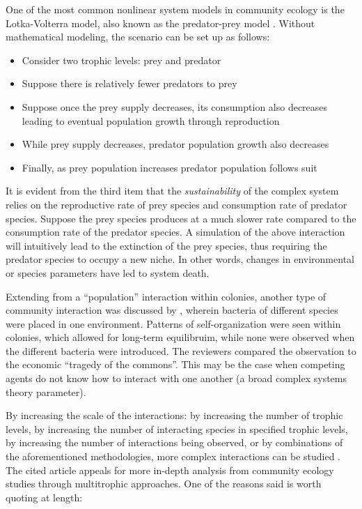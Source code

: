 One of the most common nonlinear system models in community ecology is the Lotka-Volterra model, also known as the predator-prey model \cite{Seibold2018}.
Without mathematical modeling, the scenario can be set up as follows:

\begin{itemize}
    \item Consider two trophic levels: prey and predator
    \item Suppose there is relatively fewer predators to prey
    \item Suppose once the prey supply decreases, its consumption also decreases
    leading to eventual population growth through reproduction
    \item While prey supply decreases, predator population growth also decreases
    \item Finally, as prey population increases predator population follows suit
\end{itemize}

It is evident from the third item that the \emph{sustainability} of the complex system relies on the reproductive rate of prey species and consumption rate of predator species.
Suppose the prey species produces at a much slower rate compared to the consumption rate of the predator species.
A simulation of the above interaction will intuitively lead to the extinction of the prey species, thus requiring the predator species to occupy a new niche.
In other words, changes in environmental or species parameters have led to system death.

Extending from a ``population'' interaction within colonies, another type of community interaction was discussed by , wherein bacteria of different species were placed in one environment.
Patterns of self-organization were seen within colonies, which allowed for long-term equilibruim, while none were observed when the different bacteria were introduced.
The reviewers compared the observation to the economic ``tragedy of the commons''.
This may be the case when competing agents do not know how to interact with one another (a broad complex systems theory parameter).

By increasing the scale of the interactions: by increasing the number of trophic levels, by increasing the number of interacting species in specified trophic levels, by increasing the number of interactions being observed, or by combinations of the aforementioned methodologies, more complex interactions can be studied \cite{Seibold2018}.
The cited article appeals for more in-depth analysis from community ecology studies through multitrophic approaches.
One of the reasons said is worth quoting at length:

